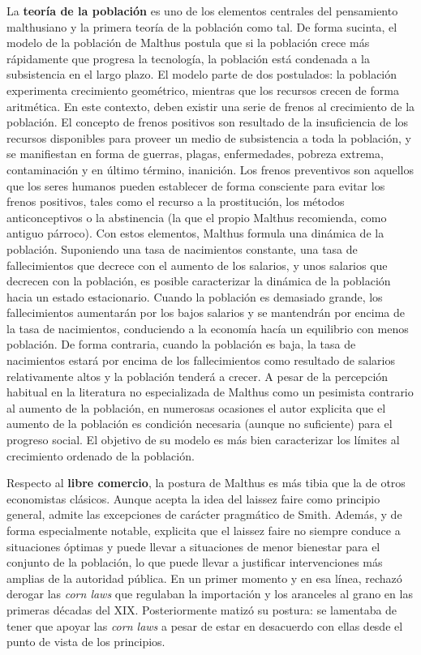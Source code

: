 \documentclass{nuevotema}
\begin{document}
La \textbf{teoría de la población} es uno de los elementos centrales del pensamiento malthusiano y la primera teoría de la población como tal. De forma sucinta, el modelo de la población de Malthus postula que si la población crece más rápidamente que progresa la tecnología, la población está condenada a la subsistencia en el largo plazo. El modelo parte de dos postulados: la población experimenta crecimiento geométrico, mientras que los recursos crecen de forma aritmética. En este contexto, deben existir una serie de frenos al crecimiento de la población. El concepto de frenos positivos son resultado de la insuficiencia de los recursos disponibles para proveer un medio de subsistencia a toda la población, y se manifiestan en forma de guerras, plagas, enfermedades, pobreza extrema, contaminación y en último término, inanición. Los frenos preventivos son aquellos que los seres humanos pueden establecer de forma consciente para evitar los frenos positivos, tales como el recurso a la prostitución, los métodos anticonceptivos o la abstinencia (la que el propio Malthus recomienda, como antiguo párroco). Con estos elementos, Malthus formula una dinámica de la población. Suponiendo una tasa de nacimientos constante, una tasa de fallecimientos que decrece con el aumento de los salarios, y unos salarios que decrecen con la población, es posible caracterizar la dinámica de la población hacia un estado estacionario. Cuando la población es demasiado grande, los fallecimientos aumentarán por los bajos salarios y se mantendrán por encima de la tasa de nacimientos, conduciendo a la economía hacía un equilibrio con menos población. De forma contraria, cuando la población es baja, la tasa de nacimientos estará por encima de los fallecimientos como resultado de salarios relativamente altos y la población tenderá a crecer. A pesar de la percepción habitual en la literatura no especializada de Malthus como un pesimista contrario al aumento de la población, en numerosas ocasiones el autor explicita que el aumento de la población es condición necesaria (aunque no suficiente) para el progreso social. El objetivo de su modelo es más bien caracterizar los límites al crecimiento ordenado de la población.

Respecto al \textbf{libre comercio}, la postura de Malthus es más tibia que la de otros economistas clásicos. Aunque acepta la idea del laissez faire como principio general, admite las excepciones de carácter pragmático de Smith. Además, y de forma especialmente notable, explicita que el laissez faire no siempre conduce a situaciones óptimas y puede llevar a situaciones de menor bienestar para el conjunto de la población, lo que puede llevar a justificar intervenciones más amplias de la autoridad pública. En un primer momento y en esa línea, rechazó derogar las \textit{corn laws} que regulaban la importación y los aranceles al grano en las primeras décadas del XIX. Posteriormente matizó su postura: se lamentaba de tener que apoyar las \textit{corn laws} a pesar de estar en desacuerdo con ellas desde el punto de vista de los principios. 
\end{document}
